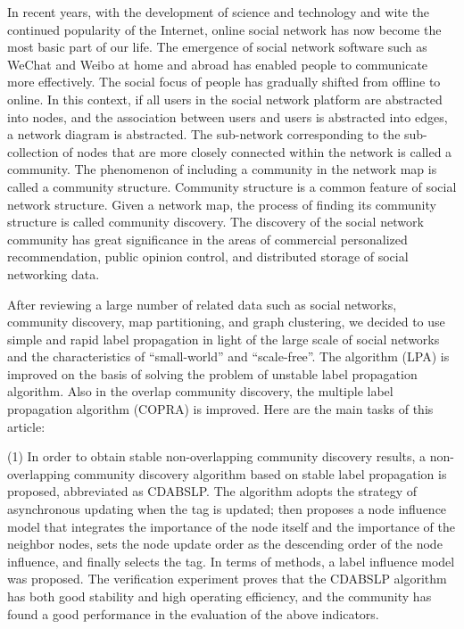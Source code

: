 \begin{englishabstract}

In recent years, with the development of science and technology and wite the continued popularity of the Internet, online social network has now become the most basic part of our life. The emergence of social network software such as WeChat and Weibo at home and abroad has enabled people to communicate more effectively. The social focus of people has gradually shifted from offline to online. In this context, if all users in the social network platform are abstracted into nodes, and the association between users and users is abstracted into edges, a network diagram is abstracted. The sub-network corresponding to the sub-collection of nodes that are more closely connected within the network is called a community. The phenomenon of including a community in the network map is called a community structure. Community structure is a common feature of social network structure. Given a network map, the process of finding its community structure is called community discovery. The discovery of the social network community has great significance in the areas of commercial personalized recommendation, public opinion control, and distributed storage of social networking data.

After reviewing a large number of related data such as social networks, community discovery, map partitioning, and graph clustering, we decided to use simple and rapid label propagation in light of the large scale of social networks and the characteristics of “small-world” and “scale-free”. The algorithm (LPA) is improved on the basis of solving the problem of unstable label propagation algorithm. Also in the overlap community discovery, the multiple label propagation algorithm (COPRA) is improved. Here are the main tasks of this article:

(1) In order to obtain stable non-overlapping community discovery results, a non-overlapping community discovery algorithm based on stable label propagation is proposed, abbreviated as CDABSLP. The algorithm adopts the strategy of asynchronous updating when the tag is updated; then proposes a node influence model that integrates the importance of the node itself and the importance of the neighbor nodes, sets the node update order as the descending order of the node influence, and finally selects the tag. In terms of methods, a label influence model was proposed. The verification experiment proves that the CDABSLP algorithm has both good stability and high operating efficiency, and the community has found a good performance in the evaluation of the above indicators.


\end{englishabstract}
